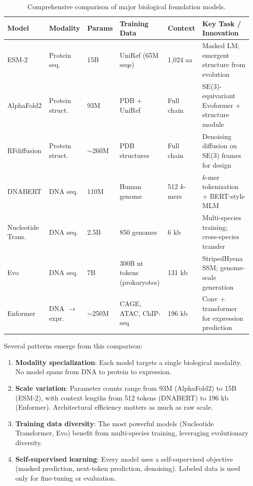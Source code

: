 \begin{table}[ht]
\centering
\caption{Comprehensive comparison of major biological foundation models.}
\label{tab:bio-fm-comparison}
\begin{tabularx}{\textwidth}{L{2.0cm} L{1.5cm} L{1.5cm} L{2.0cm} L{1.8cm} Y}
\toprule
\textbf{Model} & \textbf{Modality} & \textbf{Params} & \textbf{Training Data} & \textbf{Context} & \textbf{Key Task / Innovation} \\
\midrule
ESM-2 & Protein seq. & 15B & UniRef (65M seqs) & 1,024 aa & Masked LM; emergent structure from evolution \\[4pt]
AlphaFold2 & Protein struct. & 93M & PDB + UniRef & Full chain & SE(3)-equivariant Evoformer + structure module \\[4pt]
RFdiffusion & Protein struct. & $\sim$260M & PDB structures & Full chain & Denoising diffusion on SE(3) frames for design \\[4pt]
DNABERT & DNA seq. & 110M & Human genome & 512 $k$-mers & $k$-mer tokenization + BERT-style MLM \\[4pt]
Nucleotide Trans. & DNA seq. & 2.5B & 850 genomes & 6 kb & Multi-species training; cross-species transfer \\[4pt]
Evo & DNA seq. & 7B & 300B nt tokens (prokaryotes) & 131 kb & StripedHyena SSM; genome-scale generation \\[4pt]
Enformer & DNA $\to$ expr. & $\sim$250M & CAGE, ATAC, ChIP-seq & 196 kb & Conv + transformer for expression prediction \\
\bottomrule
\end{tabularx}
\end{table}

Several patterns emerge from this comparison:

\begin{enumerate}[leftmargin=1.8em]
  \item \textbf{Modality specialization}: Each model targets a single biological modality. No model spans from DNA to protein to expression.
  \item \textbf{Scale variation}: Parameter counts range from 93M (AlphaFold2) to 15B (ESM-2), with context lengths from 512 tokens (DNABERT) to 196 kb (Enformer). Architectural efficiency matters as much as raw scale.
  \item \textbf{Training data diversity}: The most powerful models (Nucleotide Transformer, Evo) benefit from multi-species training, leveraging evolutionary diversity.
  \item \textbf{Self-supervised learning}: Every model uses a self-supervised objective (masked prediction, next-token prediction, denoising). Labeled data is used only for fine-tuning or evaluation.
\end{enumerate}

